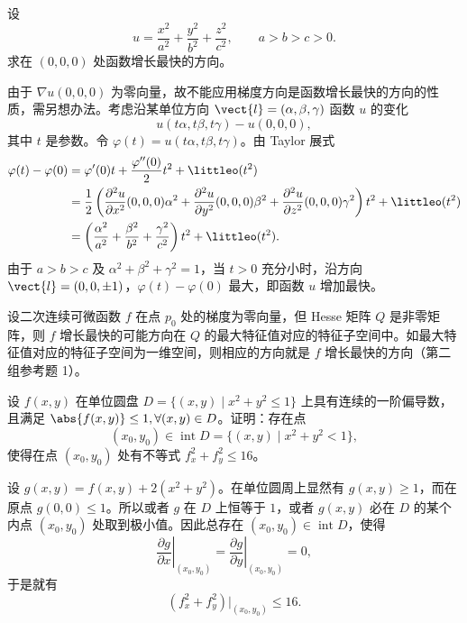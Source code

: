 \begin{xexample}[21.3.2]
设
\[
  u=\frac{x^2}{a^2}+\frac{y^2}{b^2}+\frac{z^2}{c^2},\qquad a>b>c>0.
\]
求在 $(0,0,0)$ 处函数增长最快的方向。
\end{xexample}
\begin{xsolution}
由于 $\nabla u(0,0,0)$ 为零向量，故不能应用梯度方向是函数增长最快的方向的性质，需另想办法。考虑沿某单位方向 $\vect{l}=(\alpha,\beta,\gamma)$ 函数 $u$ 的变化
\[
  u(t\alpha,t\beta,t\gamma)-u(0,0,0),
\]
其中 $t$ 是参数。令 $\varphi(t)=u(t\alpha,t\beta,t\gamma)$。由 Taylor 展式
\[
\begin{aligned}
  \varphi(t)-\varphi(0)
  &=\varphi'(0)t+\frac{\varphi''(0)}2t^2+\littleo(t^2)\\
  &=\frac12\left(
  \frac{\partial^2u}{\partial x^2}(0,0,0)\alpha^2
  +\frac{\partial^2u}{\partial y^2}(0,0,0)\beta^2
  +\frac{\partial^2u}{\partial z^2}(0,0,0)\gamma^2
  \right)t^2+\littleo(t^2)\\
  &=\left(\frac{\alpha^2}{a^2}+\frac{\beta^2}{b^2}+\frac{\gamma^2}{c^2}\right)t^2+\littleo(t^2).
\end{aligned}
\]
由于 $a>b>c$ 及 $\alpha^2+\beta^2+\gamma^2=1$，当 $t>0$ 充分小时，沿方向 $\vect{l}=(0,0,\pm1)$，$\varphi(t)-\varphi(0)$ 最大，即函数 $u$ 增加最快。
\end{xsolution}

\begin{xremark}
设二次连续可微函数 $f$ 在点 $p_0$ 处的梯度为零向量，但 Hesse 矩阵 $Q$ 是非零矩阵，则 $f$ 增长最快的可能方向在 $Q$ 的最大特征值对应的特征子空间中。如最大特征值对应的特征子空间为一维空间，则相应的方向就是 $f$ 增长最快的方向（第二组参考题 1）。
\end{xremark}

\begin{xexample}[21.3.3]
设 $f(x,y)$ 在单位圆盘 $D=\{(x,y)\mid x^2+y^2\le1\}$ 上具有连续的一阶偏导数，且满足 $\abs{f(x,y)}\le1,\forall(x,y)\in D$。证明：存在点
\[
  (x_0,y_0)\in\operatorname{int}D=\{(x,y)\mid x^2+y^2<1\},
\]
使得在点 $(x_0,y_0)$ 处有不等式 $f_x^2+f_y^2\le16$。
\end{xexample}
\begin{xproof}
设 $g(x,y)=f(x,y)+2(x^2+y^2)$。在单位圆周上显然有 $g(x,y)\ge1$，而在原点 $g(0,0)\le1$。所以或者 $g$ 在 $D$ 上恒等于 $1$，或者 $g(x,y)$ 必在 $D$ 的某个内点 $(x_0,y_0)$ 处取到极小值。因此总存在 $(x_0,y_0)\in\operatorname{int}D$，使得
\[
  \left.\frac{\partial g}{\partial x}\right|_{(x_0,y_0)}
  =\left.\frac{\partial g}{\partial y}\right|_{(x_0,y_0)}=0,
\]
于是就有
\[
  (f_x^2+f_y^2)|_{(x_0,y_0)}\le16.
\]
\end{xproof}

